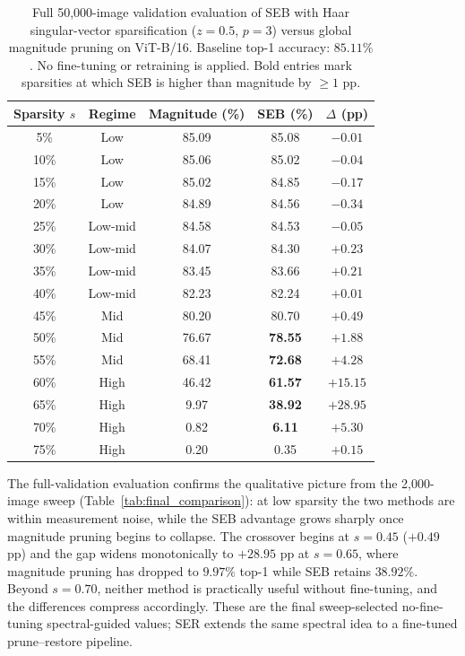 \documentclass[11pt]{article}
\theoremstyle{plain}
\theoremstyle{definition}
\theoremstyle{remark}
\newcommand{\1}{\mathbf{1}}
\begin{document}
\begin{table}[ht]
\centering
\caption{Full 50{,}000-image validation evaluation of SEB with Haar singular-vector sparsification (\(z=0.5\), \(p=3\)) versus global magnitude pruning on ViT-B/16.  Baseline top-1 accuracy: \(85.11\%\).  No fine-tuning or retraining is applied.  Bold entries mark sparsities at which SEB is higher than magnitude by \(\ge 1\) pp.}
\label{tab:final_comparison_10k}
\begin{tabular}{ccccc}
\toprule
Sparsity \(s\) & Regime & Magnitude (\%) & SEB (\%) & \(\Delta\) (pp) \\
\midrule
5\%  & Low     & 85.09 & 85.08         & \(-0.01\) \\
10\% & Low     & 85.06 & 85.02         & \(-0.04\) \\
15\% & Low     & 85.02 & 84.85         & \(-0.17\) \\
20\% & Low     & 84.89 & 84.56         & \(-0.34\) \\
\midrule
25\% & Low-mid & 84.58 & 84.53         & \(-0.05\) \\
30\% & Low-mid & 84.07 & 84.30         & \(+0.23\) \\
35\% & Low-mid & 83.45 & 83.66         & \(+0.21\) \\
40\% & Low-mid & 82.23 & 82.24         & \(+0.01\) \\
\midrule
45\% & Mid     & 80.20 & 80.70         & \(+0.49\) \\
50\% & Mid     & 76.67 & \textbf{78.55} & \(+1.88\) \\
55\% & Mid     & 68.41 & \textbf{72.68} & \(+4.28\) \\
\midrule
60\% & High    & 46.42 & \textbf{61.57} & \(+15.15\) \\
65\% & High    &  9.97 & \textbf{38.92} & \(+28.95\) \\
70\% & High    &  0.82 & \textbf{6.11}  & \(+5.30\) \\
75\% & High    &  0.20 & 0.35          & \(+0.15\) \\
\bottomrule
\end{tabular}
\end{table}

The full-validation evaluation confirms the qualitative picture from the 2{,}000-image sweep (Table~\ref{tab:final_comparison}): at low sparsity the two methods are within measurement noise, while the SEB advantage grows sharply once magnitude pruning begins to collapse.  The crossover begins at \(s=0.45\) (\(+0.49\) pp) and the gap widens monotonically to \(+28.95\) pp at \(s=0.65\), where magnitude pruning has dropped to \(9.97\%\) top-1 while SEB retains \(38.92\%\).  Beyond \(s=0.70\), neither method is practically useful without fine-tuning, and the differences compress accordingly.  These are the final sweep-selected no-fine-tuning spectral-guided values; SER extends the same spectral idea to a fine-tuned prune--restore pipeline.
\end{document}
